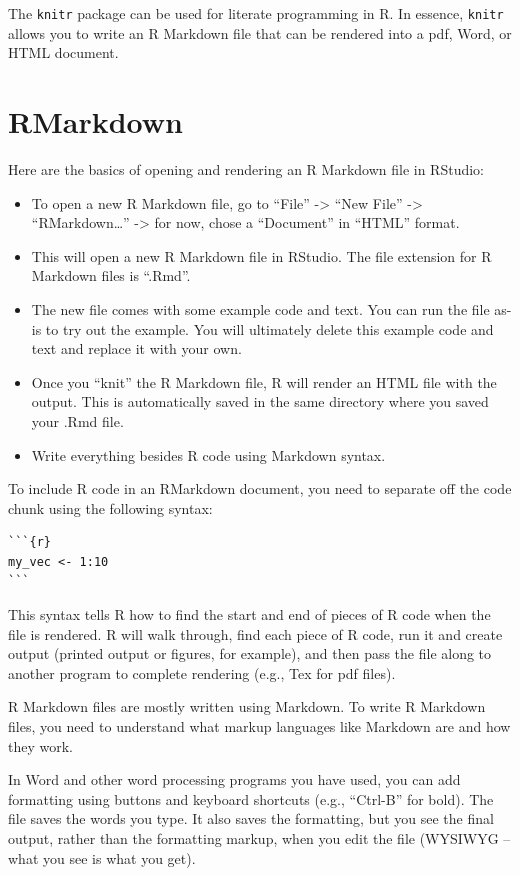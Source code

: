 \documentclass[]{tufte-book}
\providecommand{\tightlist}{%
  \setlength{\itemsep}{0pt}\setlength{\parskip}{0pt}}
\begin{document}
The \texttt{knitr} package can be used for literate programming in R. In essence, \texttt{knitr} allows you to write an R Markdown file that can be rendered into a pdf, Word, or HTML document.

\hypertarget{rmarkdown}{%
\section{RMarkdown}\label{rmarkdown}}

Here are the basics of opening and rendering an R Markdown file in RStudio:

\begin{itemize}
\tightlist
\item
  To open a new R Markdown file, go to ``File'' -\textgreater{} ``New File'' -\textgreater{} ``RMarkdown\ldots{}'' -\textgreater{} for now, chose a ``Document'' in ``HTML'' format.
\item
  This will open a new R Markdown file in RStudio. The file extension for R Markdown files is ``.Rmd''.
\item
  The new file comes with some example code and text. You can run the file as-is to try out the example. You will ultimately delete this example code and text and replace it with your own.
\item
  Once you ``knit'' the R Markdown file, R will render an HTML file with the output. This is automatically saved in the same directory where you saved your .Rmd file.
\item
  Write everything besides R code using Markdown syntax.
\end{itemize}

To include R code in an RMarkdown document, you need to separate off the code chunk using the following syntax:

\begin{verbatim}
```{r}
my_vec <- 1:10
```
\end{verbatim}

This syntax tells R how to find the start and end of pieces of R code when the file is rendered. R will walk through, find each piece of R code, run it and create output (printed output or figures, for example), and then pass the file along to another program to complete rendering (e.g., Tex for pdf files).

R Markdown files are mostly written using Markdown. To write R Markdown files, you need to understand what markup languages like Markdown are and how they work.

In Word and other word processing programs you have used, you can add formatting using buttons and keyboard shortcuts (e.g., ``Ctrl-B'' for bold). The file saves the words you type. It also saves the formatting, but you see the final output, rather than the formatting markup, when you edit the file (WYSIWYG -- what you see is what you get).
\end{document}
